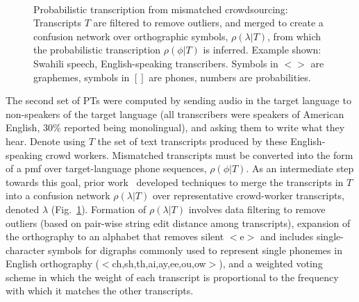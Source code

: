 \begin{figure}[b!]
\begin{center}
\\
\end{center}
\setlength{\abovecaptionskip}{0pt}
\caption{Probabilistic transcription from mismatched crowdsourcing:
  Transcripts $T$ are filtered to remove outliers, and merged to
  create a confusion network over orthographic symbols,
  $\rho(\lambda|T)$, from which the probabilistic transcription
  $\rho(\phi|T)$ is inferred. Example shown: Swahili speech,
  English-speaking transcribers.  Symbols in $<$$>$ are graphemes,
  symbols in $[]$ are phones, numbers are probabilities.}
\label{fig:mcmethods}
\end{figure}

The second set of PTs were computed by sending audio in the target
language to non-speakers of the target language (all transcribers were
speakers of American English, 30\% reported being monolingual), and
asking them to write what they hear.  Denote using $T$ the set of text
transcripts produced by these English-speaking crowd workers.
Mismatched transcripts must be converted into the form of a pmf over
target-language phone sequences, $\rho(\phi|T)$.  As an intermediate
step towards this goal, prior work~\cite{JHJ15b} developed techniques
to merge the transcripts in $T$ into a confusion network
$\rho(\lambda|T)$ over representative crowd-worker transcripts,
denoted $\lambda$ (Fig.~\ref{fig:mcmethods}).  Formation of
$\rho(\lambda|T)$ involves data filtering to remove outliers (based on
pair-wise string edit distance among transcripts), expansion of the
orthography to an alphabet that removes silent $<$e$>$ and includes
single-character symbols for digraphs commonly used to represent
single phonemes in English orthography
($<$ch,sh,th,ai,ay,ee,ou,ow$>$), and a weighted voting scheme in which
the weight of each transcript is proportional to the frequency with
which it matches the other transcripts.

